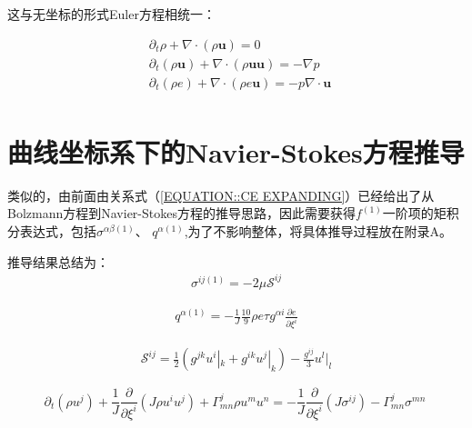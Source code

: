 \documentclass[MathematicsNumericsDerivationsAndOpenFOAM.tex]{subfiles}
\begin{document}
这与无坐标的形式Euler方程相统一：


\begin{equation}
  \begin{aligned}
     & \partial_t \rho + \nabla \cdot (\rho \boldsymbol{u})=0                                                      \\
     & \partial_{t}\left(\rho \boldsymbol{u} \right)+ \nabla \cdot (\rho \boldsymbol{u} \boldsymbol{u}) =-\nabla p \\
     & \partial_{t}\left(\rho e \right) + \nabla \cdot (\rho e \boldsymbol{u})=-p \nabla \cdot \boldsymbol{u}      \\
  \end{aligned}
  \label{EQUATION::Eluer2} ~
\end{equation}
%
%
%
%
%
%
\section{曲线坐标系下的Navier-Stokes方程推导}
%
%

类似的，由前面由关系式（\ref{EQUATION::CE EXPANDING}）已经给出了从Bolzmann方程到Navier-Stokes方程的推导思路，因此需要获得$f^{(1)}$一阶项的矩积分表达式，包括$\sigma^{\alpha\beta(1)}$、 $q^{\alpha (1)}$,为了不影响整体，将具体推导过程放在附录A。

推导结果总结为：
\begin{equation}
  \begin{gathered}
    \sigma^{ij(1)}=  - 2 \mu \mathcal{S}^{ij}
  \end{gathered}
\end{equation}



\begin{equation}
  \begin{gathered}
    q^{\alpha (1)}
    = -\frac{1}{J}\frac{10}{9}\rho e \tau g^{\alpha i}\frac{\partial e}{\partial \xi^i}
  \end{gathered}
\end{equation}


\begin{equation}
  \begin{gathered}
    \mathcal{S}^{ij}=\frac{1}{2} (g^{jk} u^i|_k+g^{ik} u^j|_k) -\frac{g^{ij}}{3}u^l|_l
  \end{gathered}
\end{equation}




\begin{equation}
  \boxed{
    \partial_{t}\left(\rho u^{j}\right)+\frac{1}{J} \frac{\partial}{\partial \xi^{i}}\left(J \rho u^{i} u^{j} \right)+\Gamma_{mn}^{j} \rho u^{m} u^{n} = - \frac{1}{J} \frac{\partial}{\partial \xi^{i}}\left(J \sigma^{ij} \right) -\Gamma_{mn}^{j} \sigma^{mn}
  }
  \label{动量方程输运形式} ~
\end{equation}
%
\end{document}

